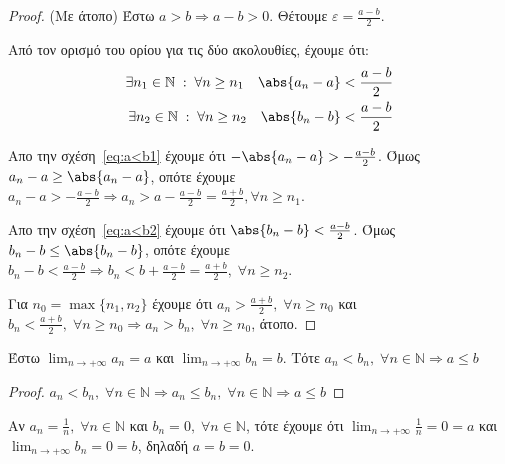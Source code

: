 \documentclass[main.tex]{subfiles}
\begin{document}
\begin{proof}(Με άτοπο)
    Έστω $ a>b \Rightarrow a-b>0 $. Θέτουμε $ \varepsilon = \frac{a-b}{2} $.

   Από τον ορισμό του ορίου για τις δύο ακολουθίες, έχουμε ότι:
\begin{align}
    \exists n_{1} \in \mathbb{N} \; : \; \forall n \geq n_{1} \quad \abs{a_{n}-a} < \frac{a-b}{2} 
    \label{eq:a<b1} \\
    \exists n_{2} \in \mathbb{N} \; : \; \forall n \geq n_{2} \quad \abs{b_{n}-b} < \frac{a-b}{2}
    \label{eq:a<b2} \\
\end{align}

Απο την σχέση~\eqref{eq:a<b1} έχουμε ότι $ - \abs{a_{n}-a} > - \frac{a-b}{2} $. Όμως $ a_{n}- a \geq 
\abs{a_{n}-a} $, οπότε έχουμε $ a_{n}- a > - \frac{a-b}{2} \Rightarrow a_{n} > a -
\frac{a-b}{2} = \frac{a+b}{2}, \forall n \geq n_{1} $.

Απο την σχέση~\eqref{eq:a<b2} έχουμε ότι $  \abs{b_{n}-b} <  \frac{a-b}{2} $. Όμως $ b_{n}- b \leq 
\abs{b_{n}-b} $, οπότε έχουμε $ b_{n}- b <  \frac{a-b}{2} \Rightarrow b_{n} <  b +
\frac{a-b}{2} = \frac{a+b}{2}, \; \forall n \geq n_{2}  $.

Για $ n_{0} = \max \{ n_{1}, n_{2} \} $ έχουμε ότι $ a_{n} > \frac{a+b}{2}, \; \forall n \geq n_{0}$
και $ b_{n} < \frac{a+b}{2}, \; \forall n \geq n_{0} \Rightarrow a_{n} > b_{n}, \; \forall n 
\geq n_{0} $, άτοπο.

\end{proof}


\begin{prop}
    Έστω $ \lim_{n \to +\infty} a_{n} = a $ και $ \lim_{n \to +\infty} b_{n} = b $. Τότε
    $
        a_{n} < b_{n}, \; \forall n \in \mathbb{N} \Rightarrow a \leq b
     $ 
\end{prop}

\begin{proof}
    $ a_{n}< b_{n}, \; \forall n \in \mathbb{N} \Rightarrow a_{n} \leq b_{n}, \; \forall n \in
    \mathbb{N} \Rightarrow a \leq b $
\end{proof}

\begin{rem}
\item {}
    Αν $ a_{n}= \frac{1}{n}, \; \forall n \in \mathbb{N} $ και $ b_{n}=0, \; \forall n \in
    \mathbb{N} $, τότε έχουμε ότι $ \lim_{n \to +\infty} \frac{1}{n} = 0 = a $ και $ \lim_{n \to
    +\infty} b_{n} = 0 = b $, δηλαδή $ a=b=0  $.
\end{rem}
\end{document}
